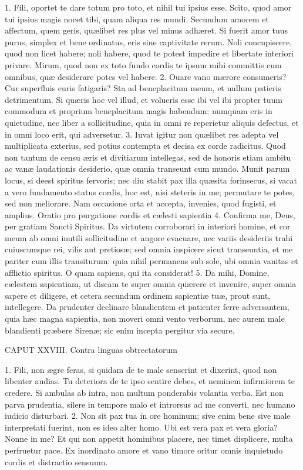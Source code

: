 \documentclass[twoside]{article}
\begin{document}
1. Fili, oportet te dare totum pro toto, et nihil tui ipsius esse. Scito, quod amor tui ipsius magis nocet tibi, quam aliqua res mundi. Secundum amorem et affectum, quem geris, quælibet res plus vel minus adhæret. Si fuerit amor tuus purus, simplex et bene ordinatus, eris sine captivitate rerum. Noli concupiscere, quod non licet habere; noli habere, quod te potest impedire et libertate interiori privare. Mirum, quod non ex toto fundo cordis te ipsum mihi committis cum omnibus, quæ desiderare potes vel habere.
2. Ouare vano mærore consumeris? Cur superfluis curis fatigaris? Sta ad beneplacitum meum, et nullum patieris detrimentum. Si quæris hoc vel illud, et volueris esse ibi vel ibi propter tuum commodum et proprium beneplacitum magis habendum: numquam eris in quietudine, nec liber a sollicitudine, quia in omni re reperietur aliquis defectus, et in omni loco erit, qui adversetur.
3. Iuvat igitur non quælibet res adepta vel multiplicata exterius, sed potius contempta et decisa ex corde radicitus. Quod non tantum de censu æris et divitiarum intellegas, sed de honoris etiam ambitu ac vanæ laudationis desiderio, quæ omnia transeunt cum mundo. Munit parum locus, si deest spiritus fervoris; nec diu stabit pax illa quæsita forinsecus, si vacat a vero fundamento status cordis, hoc est, nisi steteris in me; permutare te potes, sed non meliorare. Nam occasione orta et accepta, invenies, quod fugisti, et amplius.
Oratio pro purgatione cordis et cælesti sapientia
4. Confirma me, Deus, per gratiam Sancti Spiritus. Da virtutem corroborari in interiori homine, et cor meum ab omni inutili sollicitudine et angore evacuare, nec variis desideriis trahi cuiuscumque rei, vilis aut pretiosæ; sed omnia inspicere sicut transeuntia, et me pariter cum illis transiturum: quia nihil permanens sub sole, ubi omnia vanitas et afflictio spiritus. O quam sapiens, qui ita considerat!
5. Da mihi, Domine, cælestem sapientiam, ut discam te super omnia quærere et invenire, super omnia sapere et diligere, et cetera secundum ordinem sapientiæ tuæ, prout sunt, intellegere. Da prudenter declinare blandientem et patienter ferre adversantem, quia hæc magna sapientia, non moveri omni vento verborum, nec aurem male blandienti præbere Sirenæ; sic enim incepta pergitur via secure.


CAPUT XXVIII.
Contra linguas obtrectatorum

1. Fili, non ægre feras, si quidam de te male senserint et dixerint, quod non libenter audias. Tu deteriora de te ipso sentire debes, et neminem infirmiorem te credere. Si ambulas ab intra, non multum ponderabis volantia verba. Est non parva prudentia, silere in tempore malo et introrsus ad me converti, nec humano iudicio disturbari.
2. Non sit pax tua in ore hominum; sive enim bene sive male interpretati fuerint, non es ideo alter homo. Ubi est vera pax et vera gloria? Nonne in me? Et qui non appetit hominibus placere, nec timet displicere, multa perfruetur pace. Ex inordinato amore et vano timore oritur omnis inquietudo cordis et distractio sensuum.
\end{document}
